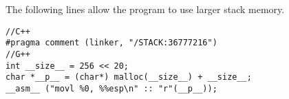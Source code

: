 The following lines allow the program to use larger stack memory.
\begin{lstlisting}
//C++
#pragma comment (linker, "/STACK:36777216")
//G++
int __size__ = 256 << 20;
char *__p__ = (char*) malloc(__size__) + __size__;
__asm__ ("movl %0, %%esp\n" :: "r"(__p__));
\end{lstlisting}

